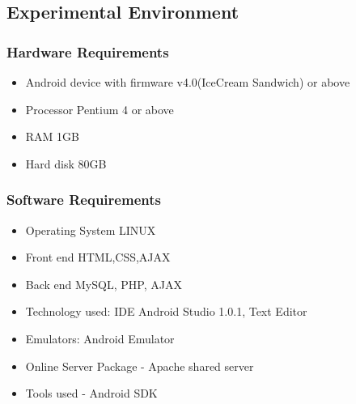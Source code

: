 \documentclass[12pt, a4paper]{article}
\begin{document}
\subsection{Experimental Environment}
\subsubsection{Hardware Requirements}
\begin{itemize}
\item Android device with firmware v4.0(IceCream Sandwich) or above 
\end{itemize}
 
\begin{itemize}
\item Processor Pentium 4 or above
\end{itemize}
\begin{itemize}
\item RAM 1GB
\end{itemize}
\begin{itemize}
\item Hard disk 80GB
\end{itemize}
\subsubsection{Software Requirements}
\begin{itemize}
\item Operating System LINUX
\end{itemize}
\begin{itemize}
\item Front end HTML,CSS,AJAX
\end{itemize}
\begin{itemize}
\item Back end MySQL, PHP, AJAX
\end{itemize}
\begin{itemize}
\item Technology used: IDE Android Studio 1.0.1, Text Editor
\end{itemize}
\begin{itemize}
\item Emulators: Android Emulator
\end{itemize}
\begin{itemize}
\item Online Server Package - Apache shared server
\end{itemize}
\begin{itemize}
\item Tools used - Android SDK
\end{itemize}
\end{document}
